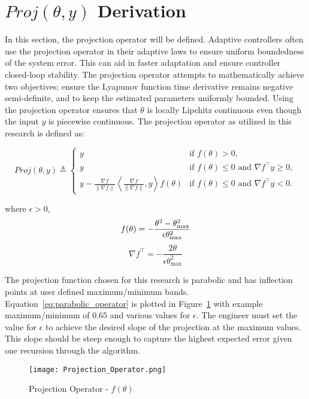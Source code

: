 \label{appendix:projection_derivation}
\section{$Proj(\theta,y)$ Derivation}

In this section, the projection operator will be defined.  Adaptive controllers often use the projection operator in their adaptive laws to ensure uniform boundedness of the system error.  This can aid in faster adaptation and ensure controller closed-loop stability.  The projection operator attempts to mathematically achieve two objectives; ensure the Lyapunov function time derivative remains negative semi-definite, and to keep the estimated parameters uniformly bounded.  Using the projection operator ensures that $\theta$ is locally Lipchitz continuous even though the input $y$ is piecewise continuous.  The projection operator as utilized in this research is defined as:

\begin{equation}
Proj(\theta,y)\triangleq 	
	\begin{cases}
	y& \text{if }f(\theta)>0, \\
	y& \text{if }f(\theta) \leq 0\text{ and }\nabla f^\top y\geq 0,\\
	y-\frac{\nabla f}{\|\nabla f\|}\left\langle\frac{\nabla f}{\|\nabla f\|},y\right\rangle f(\theta)& \text{if }f(\theta)\leq 0\text{ and }\nabla f^\top y< 0.
	\end{cases}	
\end{equation}

where $\epsilon>0$,
\begin{equation}\label{eq:parabolic_operator}
	f(\theta)=-\frac{\theta^2-\theta_{\text{max}}^2}{\epsilon \theta_{\text{max}}^2}\\
\end{equation}
\begin{equation}
	\nabla f^\top=-\frac{2\theta}{\epsilon \theta_{\text{max}}^2}
\end{equation}

The projection function chosen for this research is parabolic and has inflection points at user defined maximum/minimum bands.  Equation~\ref{eq:parabolic_operator} is plotted in Figure~\ref{fig:projection_operator} with example maximum/minimum of $0.65$ and various values for $\epsilon$.  The engineer must set the value for $\epsilon$ to achieve the desired slope of the projection at the maximum values.  This slope should be steep enough to capture the highest expected error given one recursion through the algorithm.
\begin{figure}[h!]
 \centering
  \texttt{[image: Projection\_Operator.png]}
  \caption{Projection Operator - $f(\theta)$}
  \label{fig:projection_operator}
\end{figure}

